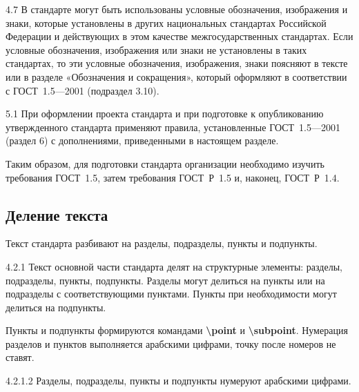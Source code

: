 \documentclass[12pt, twoside, final]{ruost}
\newcommand{\txtcmd}[1]{\textbf{\textbackslash{}#1}}
\begin{document}
\begin{OST}
					\begin{stdquote}
						\par 4.7 В стандарте могут быть использованы условные обозначения, изображения и знаки, которые установлены в других национальных стандартах Российской Федерации и действующих в этом качестве межгосударственных стандартах. Если условные обозначения, изображения или знаки не установлены в таких стандартах, то эти условные обозначения, изображения, знаки поясняют в тексте или в разделе «Обозначения и сокращения», который оформляют в соответствии с ГОСТ~1.5—2001 (подраздел 3.10).
						\par [ГОСТ Р 1.5---2012]
					\end{stdquote}
					
					\begin{stdquote}
						\par 5.1 При оформлении проекта стандарта и при подготовке к опубликованию утвержденного стандарта применяют правила, установленные ГОСТ~1.5—2001 (раздел 6) с дополнениями, приведенными в настоящем разделе.
						\par [ГОСТ Р 1.5---2012]
					\end{stdquote}
					
				\point Таким образом, для подготовки стандарта организации необходимо изучить требования ГОСТ~1.5, затем требования ГОСТ~Р~1.5 и, наконец, ГОСТ~Р~1.4.
				
			\subsection{Деление текста}
				
				\point Текст стандарта разбивают на разделы, подразделы, пункты и подпункты.
				
					\begin{stdquote}
						\par 4.2.1 Текст основной части стандарта делят на структурные элементы: разделы, подразделы, пункты, подпункты. Разделы могут делиться на пункты или на подразделы с соответствующими пунктами. Пункты при необходимости могут делиться на подпункты.
						\par [ГОСТ 1.5---2001]
					\end{stdquote}
				
				\point Пункты и подпункты формируются командами \txtcmd{point} и \txtcmd{subpoint}.
				\point Нумерация разделов и пунктов выполняется арабскими цифрами, точку после номеров не ставят.
				
					\begin{stdquote}
						\par 4.2.1.2 Разделы, подразделы, пункты и подпункты нумеруют арабскими цифрами.
						\par [ГОСТ 1.5---2001]
					\end{stdquote}
					

\end{OST}
\end{document}
